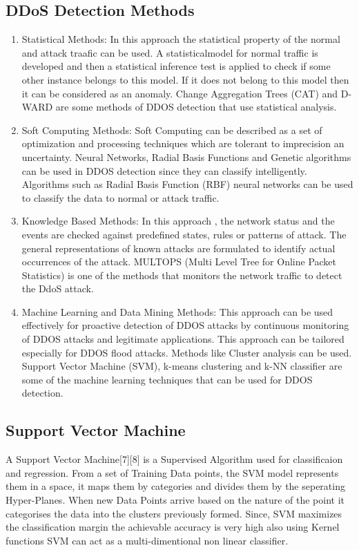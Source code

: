 \documentclass[12pt,a4paper,final]{report}
\begin{document}
\subsection{DDoS Detection Methods}
\begin{enumerate}
\item
Statistical Methods:
\newline
In this approach the statistical property of the normal and attack traafic can be used. A statisticalmodel for normal traffic is developed and then a statistical inference test is applied to check if some other instance belongs to this model. If it does not belong to this model then it can be considered as an anomaly. Change Aggregation Trees (CAT) and D-WARD are some methods of DDOS detection that use statistical analysis.

\item
Soft Computing Methods:
\newline
Soft Computing can be described as a set of optimization and processing techniques which are tolerant to imprecision an uncertainty. Neural Networks, Radial Basis Functions and Genetic algorithms can be used in DDOS detection since they can classify intelligently. Algorithms such as Radial Basis Function (RBF) neural networks can be used to classify the data to normal or attack traffic.

\item
Knowledge Based Methods:
\newline
In this approach , the network status and the events are checked against predefined states, rules or patterns of attack. The general representations of known attacks are formulated to identify actual occurrences of the attack. MULTOPS (Multi Level Tree for Online Packet Statistics) is one of the methods that monitors the network traffic to detect the DdoS attack.

\item
Machine Learning and Data Mining Methods:
\newline
This approach can be used effectively for proactive detection of DDOS attacks by continuous monitoring of DDOS attacks and legitimate applications. This approach can be tailored especially for DDOS flood attacks. Methods like Cluster analysis can be used. Support Vector Machine (SVM), k-means clustering and k-NN classifier are some of the machine learning techniques that can be used for DDOS detection.
\end{enumerate}

\subsection{Support Vector Machine}
A Support Vector Machine[7][8] is a Supervised Algorithm used for classificaion and regression. From a set of Training Data points, the SVM model represents them in a space, it maps them by categories and divides them by the seperating Hyper-Planes. When new Data Points arrive based on the nature of the point it categorises the data into the clusters previously formed. Since, SVM maximizes the classification margin the achievable accuracy is very high also using Kernel functions SVM can act as a multi-dimentional non linear classifier.
\end{document}
